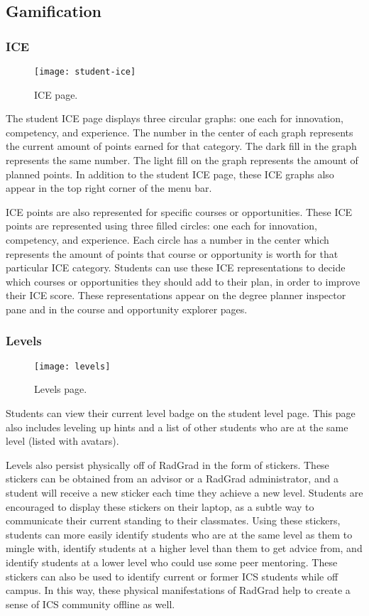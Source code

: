 \subsection{Gamification}
\subsubsection{ICE}
\begin{figure}[h]
\centering
\texttt{[image: student-ice]}
\caption{ICE page.}
\end{figure}

The student ICE page displays three circular graphs: one each for innovation, competency, and experience. The number in the center of each graph represents the current amount of points earned for that category. The dark fill in the graph represents the same number. The light fill on the graph represents the amount of planned points. In addition to the student ICE page, these ICE graphs also appear in the top right corner of the menu bar. 

ICE points are also represented for specific courses or opportunities. These ICE points are represented using three filled circles: one each for innovation, competency, and experience. Each circle has a number in the center which represents the amount of points that course or opportunity is worth for that particular ICE category. Students can use these ICE representations to decide which courses or opportunities they should add to their plan, in order to improve their ICE score. These representations appear on the degree planner inspector pane and in the course and opportunity explorer pages. 

\subsubsection{Levels}
\begin{figure}[h]
\centering
\texttt{[image: levels]}
\caption{Levels page.}
\end{figure}

Students can view their current level badge on the student level page. This page also includes leveling up hints and a list of other students who are at the same level (listed with avatars). 

Levels also persist physically off of RadGrad in the form of stickers. These stickers can be obtained from an advisor or a RadGrad administrator, and a student will receive a new sticker each time they achieve a new level. Students are encouraged to display these stickers on their laptop, as a subtle way to communicate their current standing to their classmates. Using these stickers, students can more easily identify students who are at the same level as them to mingle with, identify students at a higher level than them to get advice from, and identify students at a lower level who could use some peer mentoring. These stickers can also be used to identify current or former ICS students while off campus. In this way, these physical manifestations of RadGrad help to create a sense of ICS community offline as well. 

